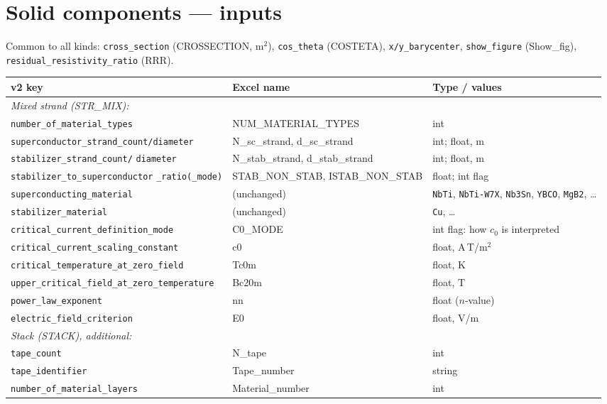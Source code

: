 \documentclass[10pt,a4paper]{article}
\newcommand{\code}[1]{\texttt{#1}}
\begin{document}
\section*{Solid components --- inputs}

Common to all kinds: \code{cross\_section} (CROSSECTION, m$^2$),
\code{cos\_theta} (COSTETA), \code{x/y\_barycenter}, \code{show\_figure}
(Show\_fig), \code{residual\_resistivity\_ratio} (RRR).

\begin{longtable}{p{7.0cm}p{3.2cm}p{5.0cm}}
\toprule
\textbf{v2 key} & \textbf{Excel name} & \textbf{Type / values} \\
\midrule
\endhead
\multicolumn{3}{l}{\emph{Mixed strand (STR\_MIX):}} \\
\code{number\_of\_material\_types} & NUM\_MATERIAL\_TYPES & int \\
\code{superconductor\_strand\_count/diameter} & N\_sc\_strand, d\_sc\_strand & int; float, m \\
\code{stabilizer\_strand\_count/} \code{diameter} & N\_stab\_strand, d\_stab\_strand & int; float, m \\
\code{stabilizer\_to\_superconductor} \code{\_ratio(\_mode)} & STAB\_NON\_STAB, ISTAB\_NON\_STAB & float; int flag \\
\code{superconducting\_material} & (unchanged) & \code{NbTi}, \code{NbTi-W7X}, \code{Nb3Sn}, \code{YBCO}, \code{MgB2}, \dots \\
\code{stabilizer\_material} & (unchanged) & \code{Cu}, \dots \\
\code{critical\_current\_definition\_mode} & C0\_MODE & int flag: how $c_0$ is interpreted \\
\code{critical\_current\_scaling\_constant} & c0 & float, A\,T/m$^2$ \\
\code{critical\_temperature\_at\_zero\_field} & Tc0m & float, K \\
\code{upper\_critical\_field\_at\_zero\_temperature} & Bc20m & float, T \\
\code{power\_law\_exponent} & nn & float ($n$-value) \\
\code{electric\_field\_criterion} & E0 & float, V/m \\
\multicolumn{3}{l}{\emph{Stack (STACK), additional:}} \\
\code{tape\_count} & N\_tape & int \\
\code{tape\_identifier} & Tape\_number & string \\
\code{number\_of\_material\_layers} & Material\_number & int \\

\end{longtable}
\end{document}
